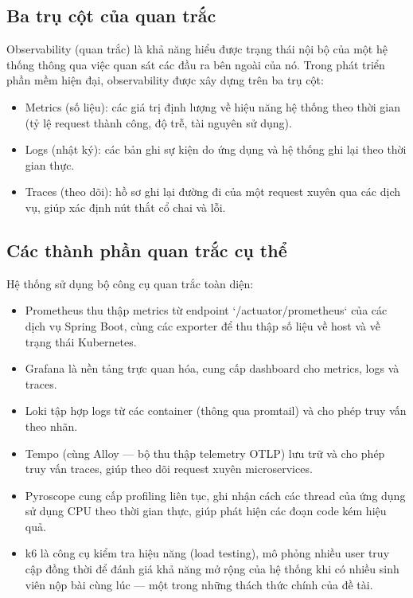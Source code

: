 \documentclass[../BTL.tex]{subfiles}
\begin{document}
\subsection{Ba trụ cột của quan trắc}
\label{section:2.9.1}

Observability (quan trắc) là khả năng hiểu được trạng thái nội bộ của một hệ thống thông qua việc quan sát các đầu ra bên ngoài của nó. Trong phát triển phần mềm hiện đại, observability được xây dựng trên ba trụ cột:
\begin{itemize}
    \item Metrics (số liệu): các giá trị định lượng về hiệu năng hệ thống theo thời gian (tỷ lệ request thành công, độ trễ, tài nguyên sử dụng).
    \item Logs (nhật ký): các bản ghi sự kiện do ứng dụng và hệ thống ghi lại theo thời gian thực.
    \item Traces (theo dõi): hồ sơ ghi lại đường đi của một request xuyên qua các dịch vụ, giúp xác định nút thắt cổ chai và lỗi.
\end{itemize}

\subsection{Các thành phần quan trắc cụ thể}
\label{section:2.9.2}

Hệ thống sử dụng bộ công cụ quan trắc toàn diện:
\begin{itemize}
    \item Prometheus thu thập metrics từ endpoint `/actuator/prometheus` của các dịch vụ Spring Boot, cùng các exporter để thu thập số liệu về host và về trạng thái Kubernetes.
    \item Grafana là nền tảng trực quan hóa, cung cấp dashboard cho metrics, logs và traces.
    \item Loki tập hợp logs từ các container (thông qua promtail) và cho phép truy vấn theo nhãn.
    \item Tempo (cùng Alloy --- bộ thu thập telemetry OTLP) lưu trữ và cho phép truy vấn traces, giúp theo dõi request xuyên microservices.
    \item Pyroscope cung cấp profiling liên tục, ghi nhận cách các thread của ứng dụng sử dụng CPU theo thời gian thực, giúp phát hiện các đoạn code kém hiệu quả.
    \item k6 là công cụ kiểm tra hiệu năng (load testing), mô phỏng nhiều user truy cập đồng thời để đánh giá khả năng mở rộng của hệ thống khi có nhiều sinh viên nộp bài cùng lúc --- một trong những thách thức chính của đề tài.
\end{itemize}
\end{document}
